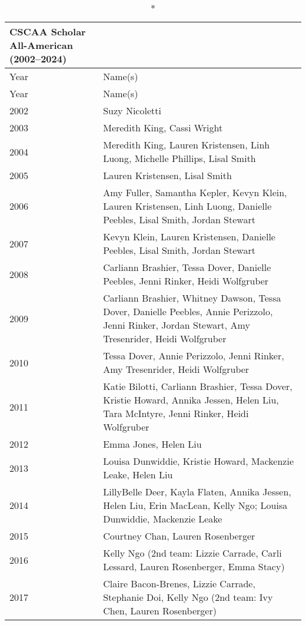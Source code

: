 \begin{longtable}{l l}
    \caption*{CSCAA Scholar All-American (2002--2024)} \\
    \toprule
    Year & Name(s) \\
    \midrule
    \endfirsthead
    
    \toprule
    Year & Name(s) \\
    \midrule
    \endhead
    
    \bottomrule
    \endfoot
    
    2002 & Suzy Nicoletti \\
    2003 & Meredith King, Cassi Wright \\
    2004 & Meredith King, Lauren Kristensen, Linh Luong, Michelle Phillips, Lisal Smith \\
    2005 & Lauren Kristensen, Lisal Smith \\
    2006 & Amy Fuller, Samantha Kepler, Kevyn Klein, Lauren Kristensen, Linh Luong, Danielle Peebles, Lisal Smith, Jordan Stewart \\
    2007 & Kevyn Klein, Lauren Kristensen, Danielle Peebles, Lisal Smith, Jordan Stewart \\
    2008 & Carliann Brashier, Tessa Dover, Danielle Peebles, Jenni Rinker, Heidi Wolfgruber \\
    2009 & Carliann Brashier, Whitney Dawson, Tessa Dover, Danielle Peebles, Annie Perizzolo, Jenni Rinker, Jordan Stewart, Amy Tresenrider, Heidi Wolfgruber \\
    2010 & Tessa Dover, Annie Perizzolo, Jenni Rinker, Amy Tresenrider, Heidi Wolfgruber \\
    2011 & Katie Bilotti, Carliann Brashier, Tessa Dover, Kristie Howard, Annika Jessen, Helen Liu, Tara McIntyre, Jenni Rinker, Heidi Wolfgruber \\
    2012 & Emma Jones, Helen Liu \\
    2013 & Louisa Dunwiddie, Kristie Howard, Mackenzie Leake, Helen Liu \\
    2014 & LillyBelle Deer, Kayla Flaten, Annika Jessen, Helen Liu, Erin MacLean, Kelly Ngo; Louisa Dunwiddie, Mackenzie Leake \\
    2015 & Courtney Chan, Lauren Rosenberger \\
    2016 & Kelly Ngo (2nd team: Lizzie Carrade, Carli Lessard, Lauren Rosenberger, Emma Stacy) \\
    2017 & Claire Bacon-Brenes, Lizzie Carrade, Stephanie Doi, Kelly Ngo (2nd team: Ivy Chen, Lauren Rosenberger) \\

\end{longtable}
